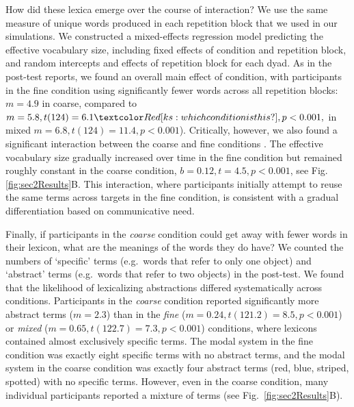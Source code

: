 How did these lexica emerge over the course of interaction? 
We use the same measure of unique words produced in each repetition block that we used in our simulations. 
We constructed a mixed-effects regression model predicting the effective vocabulary size, including fixed effects of condition and repetition block, and random intercepts and effects of repetition block for each dyad. 
As in the post-test reports, we found an overall main effect of condition, with participants in the fine condition using significantly fewer words across all repetition blocks: $m = 4.9$ in coarse, compared to $m=5.8, t(124)=6.1 \ks{which condition is this?}, p <0.001,$ in mixed $m=6.8, t(124) =11.4, p < 0.001$).
Critically, however, we also found a significant interaction between the coarse and fine conditions . 
The effective vocabulary size gradually increased over time in the fine condition but remained roughly constant in the coarse condition, $b = 0.12, t = 4.5, p < 0.001$, see Fig. \ref{fig:sec2Results}B.
This interaction, where participants initially attempt to reuse the same terms across targets in the fine condition, is consistent with a gradual differentiation based on communicative need.

Finally, if participants in the \emph{coarse} condition could get away with fewer words in their lexicon, what are the meanings of the words they do have? 
We counted the numbers of `specific' terms (e.g.~words that refer to only one object) and `abstract'  terms (e.g.~words that refer to two objects) in the post-test. 
We found that the likelihood of lexicalizing abstractions differed systematically across conditions.
Participants in the \emph{coarse} condition reported significantly more abstract terms ($m=2.3$) than in the \emph{fine} ($m = 0.24, t(121.2) = 8.5, p < 0.001$) or \emph{mixed} ($m=0.65, t(122.7)= 7.3, p < 0.001$) conditions, where lexicons contained almost exclusively specific terms.
The modal system in the fine condition was exactly eight specific terms with no abstract terms, and the modal system in the coarse condition was exactly four abstract terms (red, blue, striped, spotted) with no specific terms.
However, even in the coarse condition, many individual participants reported a mixture of terms (see Fig.\ \ref{fig:sec2Results}B).



